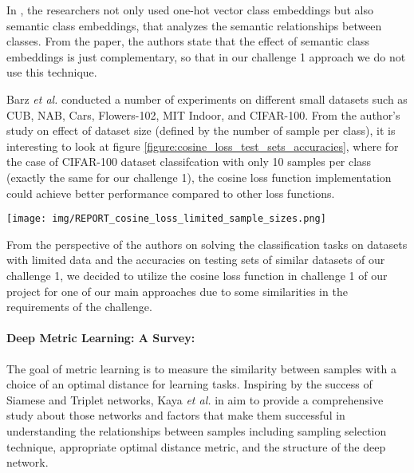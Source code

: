 \documentclass[10pt,twocolumn,letterpaper]{article}
\begin{document}
In \cite{cosine-loss}, the researchers not only used one-hot vector class embeddings but also semantic class embeddings, that analyzes the semantic relationships between classes. From the paper, the authors state that the effect of semantic class embeddings is just complementary, so that in our challenge 1 approach we do not use this technique.
\newline



Barz \textit{et al.} conducted a number of experiments on different small datasets such as CUB, NAB, Cars, Flowers-102, MIT Indoor, and CIFAR-100. From the author's study on effect of dataset size (defined by the number of sample per class), it is interesting to look at figure \ref{figure:cosine_loss_test_sets_accuracies}, where for the case of CIFAR-100 dataset classifcation with only 10 samples per class (exactly the same for our challenge 1), the cosine loss function implementation could achieve better performance compared to other loss functions. 

\begin{figure*}[h!]
    \centering
      \texttt{[image: img/REPORT\_cosine\_loss\_limited\_sample\_sizes.png]}
      \caption{Classification performance (\(\%\)) depending on dataset size (image from \cite{cosine-loss}). Cosine loss function's implementations gave a better classification performance for low samples per class cases (10, 50, 100, 150) compared to other loss function's implementations}
      \label{figure:cosine_loss_test_sets_accuracies}
    \end{figure*}
\newline

From the perspective of the authors on solving the classification tasks on datasets with limited data and the accuracies on testing sets of similar datasets of our challenge 1, we decided to utilize the cosine loss function in challenge 1 of our project for one of our main approaches due to some similarities in the requirements of the challenge.

\paragraph{Deep Metric Learning: A Survey:} The goal of metric learning is to measure the similarity between samples with a choice of an optimal distance for learning tasks. Inspiring by the success of Siamese and Triplet networks, Kaya \textit{et al.} in \cite{kay19_dml_survey} aim to provide a comprehensive study about those networks and factors that make them successful in understanding the relationships between samples including sampling selection technique, appropriate optimal distance metric, and the structure of the deep network.
\newline
\end{document}
